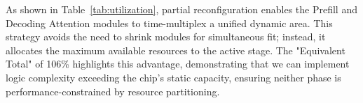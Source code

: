 \documentclass[9pt,sigconf]{acmart}
\begin{document}
\begin{table}[t]
\centering
\caption{FPGA resource consumption breakdown.}
\label{tab:utilization}
\vspace{-2mm}
\setlength{\tabcolsep}{5pt}
\renewcommand{\arraystretch}{0.8}
\vspace{-2mm}
\end{table}



As shown in Table~\ref{tab:utilization}, partial reconfiguration enables the Prefill and Decoding Attention modules to time-multiplex a unified dynamic area. This strategy avoids the need to shrink modules for simultaneous fit; instead, it allocates the maximum available resources to the active stage. The "Equivalent Total" of 106\% highlights this advantage, demonstrating that we can implement logic complexity exceeding the chip's static capacity, ensuring neither phase is performance-constrained by resource partitioning. 
\end{document}
